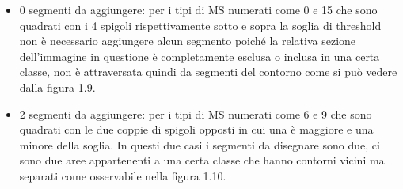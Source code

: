 \documentclass[12pt,a4paper]{report}
\begin{document}
\begin{itemize}
\item 0 segmenti da aggiungere: per i tipi di MS numerati come 0 e 15 che sono quadrati con i 4 spigoli rispettivamente sotto e sopra la soglia di threshold non è necessario aggiungere alcun segmento poiché la relativa sezione dell'immagine in questione è completamente esclusa o inclusa in una certa classe, non è attraversata quindi da segmenti del contorno come si può vedere dalla figura 1.9.
\begin{figure}[H]
\centering
\begin{floatrow}[1]
\end{floatrow}
\end{figure}
\item 2 segmenti da aggiungere: per i tipi di MS numerati come 6 e 9 che sono quadrati con le due coppie di spigoli opposti in cui una è maggiore e una minore della soglia.  In questi due casi i segmenti da disegnare sono due, ci sono due aree appartenenti a una certa classe che hanno contorni vicini ma separati come osservabile nella figura 1.10.
\begin{figure}[H]
\centering
\begin{floatrow}[1]
\end{floatrow}
\end{figure}


\end{itemize}
\end{document}
